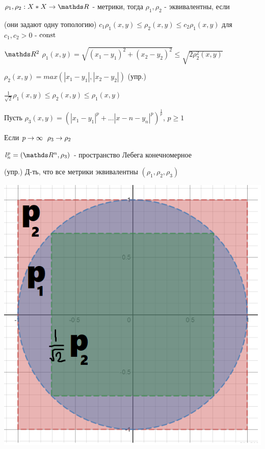 \documentclass[12pt, fleqn]{article}
\begin{document}
\begin{definition}
    $\rho_1, \rho_2: X*X \ra \R$ - метрики, тогда $\rho_1, \rho_2$ - эквивалентны, если

    (они задают одну топологию) $c_1 \rho_1 (x,y) \leqslant \rho_2 (x,y) \leqslant c_2 \rho_1(x,y)$ для $c_1,c_2>0$ - $\mathop{\rm const}\nolimits$
\end{definition}

\begin{example}
    $\R^2$ $\rho_1(x,y) = \sqrt{(x_1-y_1)^2 + (x_2-y_2)^2} \leqslant \sqrt{2 \rho_2^2(x,y)}$

    $\rho_2(x,y)=max(|x_1-y_1|, |x_2-y_2|)$ (упр.)

    $\frac{1}{\sqrt{2}} \rho_1(x,y) \leqslant \rho_2(x,y) \leqslant \rho_1(x,y)$

    Пусть $\rho_3(x,y)=(|x_1-y_1|^p+...|x-n-y_n|^p)^{\frac{1}{p}}$, $p \geqslant 1$

    Если $p \rightarrow \infty$ $\rho_3 \rightarrow \rho_2$

    $l_n^p=(\R^n,\rho_3)$ - пространство Лебега конечномерное

    (упр.) Д-ть, что все метрики эквивалентны $(\rho_1,\rho_2,\rho_3)$

    \includegraphics[scale=0.3]{pics/p1p2p3.png}
\end{example}
\end{document}
